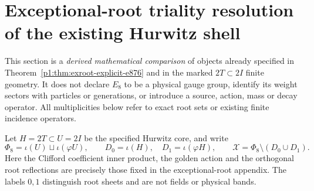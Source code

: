 \documentclass[11pt]{article}
\begin{document}
\section{Exceptional-root triality resolution of the existing Hurwitz shell}
\label{p1:sec:v370-e8-hurwitz-resolved}
This section is a \emph{derived mathematical comparison} of objects already
specified in Theorem~\ref{p1:thm:exroot-explicit-e876} and in the marked
$2T\subset2I$ finite geometry.  It does not declare $E_8$ to be a physical
gauge group, identify its weight sectors with particles or generations, or
introduce a source, action, mass or decay operator.  All multiplicities below
refer to exact root sets or existing finite incidence operators.

Let $H=2T\subset U=2I$ be the specified Hurwitz core, and write
\[
 \Phi_8=\iota(U)\sqcup\iota(\varphi U),\qquad
 D_0=\iota(H),\quad D_1=\iota(\varphi H),\qquad
 \mathscr X=\Phi_8\setminus(D_0\cup D_1).
\]
Here the Clifford coefficient inner product, the golden action and the
orthogonal root reflections are precisely those fixed in the exceptional-root
appendix.  The labels $0,1$ distinguish root sheets and are not fields or
physical bands.
\end{document}
